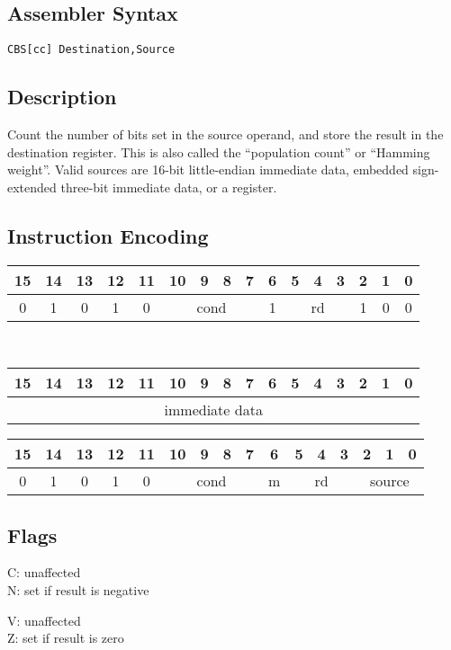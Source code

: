 \documentclass[11pt]{book}
\newcommand*{\encoding}[1]{\noindent
\begin{tabular}{|c|c|c|c|c|c|c|c|c|c|c|c|c|c|c|c|}
\multicolumn{1}{c}{15}&
\multicolumn{1}{c}{14}&
\multicolumn{1}{c}{13}&
\multicolumn{1}{c}{12}&
\multicolumn{1}{c}{11}&
\multicolumn{1}{c}{10}&
\multicolumn{1}{c}{9}&
\multicolumn{1}{c}{8}&
\multicolumn{1}{c}{7}&
\multicolumn{1}{c}{6}&
\multicolumn{1}{c}{5}&
\multicolumn{1}{c}{4}&
\multicolumn{1}{c}{3}&
\multicolumn{1}{c}{2}&
\multicolumn{1}{c}{1}&
\multicolumn{1}{c}{0}\\\hline
#1\\\hline
\end{tabular}}
\begin{document}
\subsection*{Assembler Syntax}
\texttt{CBS[cc] Destination,Source}

\subsection*{Description}
Count the number of bits set in the source operand,
and store the result in the destination register.
This is also called the ``population count'' or ``Hamming weight''.
Valid sources are 16-bit little-endian immediate data,
embedded sign-extended three-bit immediate data,
or a register.

\subsection*{Instruction Encoding}
\encoding{0&1&0&1&0%
&\multicolumn{4}{|c|}{cond}%
&1&\multicolumn{3}{|c|}{rd}&1&0&0}\\\null\qquad
\encoding{\multicolumn{16}{|c|}{immediate data}}

\vspace{2\baselineskip}
\encoding{0&1&0&1&0%
&\multicolumn{4}{|c|}{cond}%
&m&\multicolumn{3}{|c|}{rd}&\multicolumn{3}{|c|}{source}}

\subsection*{Flags}
\begin{multicols}{2}\noindent
  C: unaffected\\
  N: set if result is negative

  \columnbreak\noindent
  V: unaffected\\
  Z: set if result is zero
\end{multicols}
\end{document}
